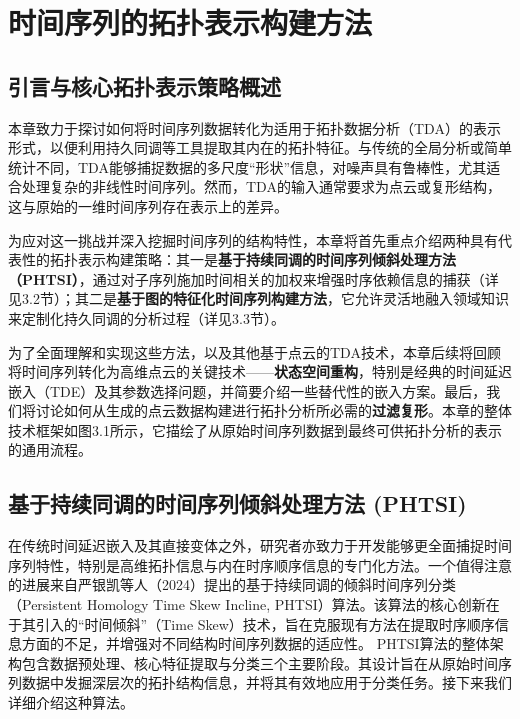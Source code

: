 \section{时间序列的拓扑表示构建方法}

\subsection{引言与核心拓扑表示策略概述} %
本章致力于探讨如何将时间序列数据转化为适用于拓扑数据分析（TDA）的表示形式，以便利用持久同调等工具提取其内在的拓扑特征。与传统的全局分析或简单统计不同，TDA能够捕捉数据的多尺度“形状”信息，对噪声具有鲁棒性，尤其适合处理复杂的非线性时间序列。然而，TDA的输入通常要求为点云或复形结构，这与原始的一维时间序列存在表示上的差异。

为应对这一挑战并深入挖掘时间序列的结构特性，本章将首先重点介绍两种具有代表性的拓扑表示构建策略：其一是\textbf{基于持续同调的时间序列倾斜处理方法（PHTSI）}，通过对子序列施加时间相关的加权来增强时序依赖信息的捕获（详见3.2节）；其二是\textbf{基于图的特征化时间序列构建方法}，它允许灵活地融入领域知识来定制化持久同调的分析过程（详见3.3节）。

为了全面理解和实现这些方法，以及其他基于点云的TDA技术，本章后续将回顾将时间序列转化为高维点云的关键技术——\textbf{状态空间重构}，特别是经典的时间延迟嵌入（TDE）及其参数选择问题，并简要介绍一些替代性的嵌入方案。最后，我们将讨论如何从生成的点云数据构建进行拓扑分析所必需的\textbf{过滤复形}。本章的整体技术框架如图3.1所示，它描绘了从原始时间序列数据到最终可供拓扑分析的表示的通用流程。

%
\subsection{基于持续同调的时间序列倾斜处理方法 (PHTSI)} %
在传统时间延迟嵌入及其直接变体之外，研究者亦致力于开发能够更全面捕捉时间序列特性，特别是高维拓扑信息与内在时序顺序信息的专门化方法。一个值得注意的进展来自严银凯等人（2024）\cite{JSJC202406009}提出的基于持续同调的倾斜时间序列分类（Persistent Homology Time Skew Incline, PHTSI）算法。该算法的核心创新在于其引入的“时间倾斜”（Time Skew）技术，旨在克服现有方法在提取时序顺序信息方面的不足，并增强对不同结构时间序列数据的适应性。
PHTSI算法的整体架构包含数据预处理、核心特征提取与分类三个主要阶段。其设计旨在从原始时间序列数据中发掘深层次的拓扑结构信息，并将其有效地应用于分类任务。接下来我们详细介绍这种算法。


